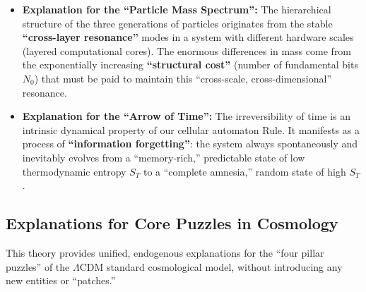 \documentclass[11pt, a4paper]{article}
\begin{document}
\begin{itemize}
    \item \textbf{Explanation for the ``Particle Mass Spectrum'':}
    The hierarchical structure of the three generations of particles originates from the stable \textbf{``cross-layer resonance''} modes in a system with different hardware scales (layered computational cores). The enormous differences in mass come from the exponentially increasing \textbf{``structural cost''} (number of fundamental bits $N_0$) that must be paid to maintain this ``cross-scale, cross-dimensional'' resonance.

    \item \textbf{Explanation for the ``Arrow of Time'':}
    The irreversibility of time is an intrinsic dynamical property of our cellular automaton Rule. It manifests as a process of \textbf{``information forgetting''}: the system always spontaneously and inevitably evolves from a ``memory-rich,'' predictable state of low thermodynamic entropy $S_T$ to a ``complete amnesia,'' random state of high $S_T$ \cite{Kolmogorov1965}.
\end{itemize}

\subsection{Explanations for Core Puzzles in Cosmology}

This theory provides unified, endogenous explanations for the ``four pillar puzzles'' of the $\Lambda$CDM standard cosmological model, without introducing any new entities or ``patches.''
\end{document}
